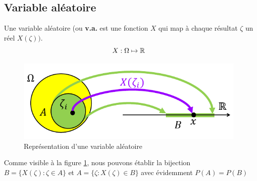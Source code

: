 \documentclass[11pt,a4paper]{article}
\numberwithin{equation}{section}
\begin{document}
\subsection{Variable aléatoire}
Une variable aléatoire (ou \textbf{v.a.} est une fonction $X$ qui map à chaque résultat $\zeta$ un réel $X(\zeta))$.
\[X : \Omega \mapsto \mathbb{R}\]
\begin{figure}[H]
	\center
	\includegraphics[scale=0.3]{images/variable_aleatoire}
	\caption{Représentation d'une variable aléatoire}
	\label{fig_variable_aleatoire}
\end{figure}
Comme visible à la figure \ref{fig_variable_aleatoire}, nous pouvons établir la bijection $B = \{X(\zeta) : \zeta \in A\}$ et $A = \{\zeta : X(\zeta) \in B\}$ avec évidemment $P(A) = P(B)$
\end{document}
